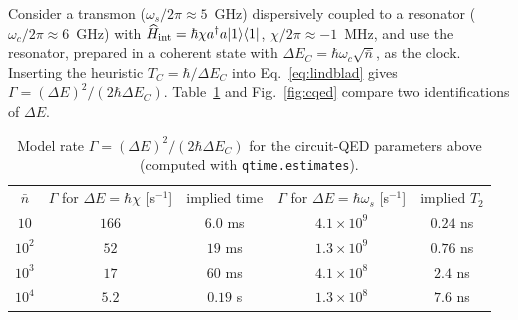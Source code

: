 \documentclass[aps,prd,onecolumn,notitlepage,10pt,amsmath,amssymb,amsfonts,nofootinbib]{revtex4-2}
\theoremstyle{definition}
\theoremstyle{remark}
\begin{document}
Consider a transmon ($\omega_s/2\pi\approx5$~GHz) dispersively coupled to a resonator ($\omega_c/2\pi\approx6$~GHz) with $\widehat H_{\rm int}=\hbar\chi a^\dagger a|1\rangle\langle1|$, $\chi/2\pi\approx-1$~MHz, and use the resonator, prepared in a coherent state with $\Delta E_C=\hbar\omega_c\sqrt{\bar n}$, as the clock. Inserting the heuristic $T_C=\hbar/\Delta E_C$ into Eq.~\eqref{eq:lindblad} gives $\Gamma=(\Delta E)^2/(2\hbar\Delta E_C)$. Table~\ref{tab:cqed} and Fig.~\ref{fig:cqed} compare two identifications of $\Delta E$.

\begin{table}[h]
\caption{Model rate $\Gamma=(\Delta E)^2/(2\hbar\Delta E_C)$ for the circuit-QED parameters above (computed with \texttt{qtime.estimates}).}
\label{tab:cqed}
\begin{ruledtabular}
\begin{tabular}{ccccc}
$\bar n$ & $\Gamma$ for $\Delta E=\hbar\chi$ [s$^{-1}$] & implied time & $\Gamma$ for $\Delta E=\hbar\omega_s$ [s$^{-1}$] & implied $T_2$ \\
\colrule
$10$ & $166$ & $6.0$ ms & $4.1\times10^{9}$ & $0.24$ ns \\
$10^2$ & $52$ & $19$ ms & $1.3\times10^{9}$ & $0.76$ ns \\
$10^3$ & $17$ & $60$ ms & $4.1\times10^{8}$ & $2.4$ ns \\
$10^4$ & $5.2$ & $0.19$ s & $1.3\times10^{8}$ & $7.6$ ns \\
\end{tabular}
\end{ruledtabular}
\end{table}
\end{document}
